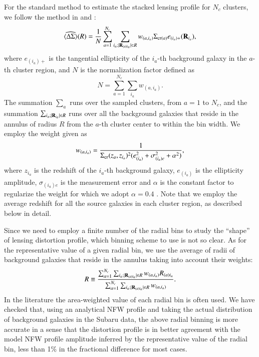 \documentclass[iop, apj]{emulateapj}
\def\ave#1{\left\langle #1 \right\rangle}
\newcommand{\?}{\stackrel{?}{=}}
\begin{document}
For the standard method to estimate the stacked lensing profile for
$N_c$ clusters,  we follow the method in
\citet{Johnstonetal:07} and \citet{Mandelbaumetal:13}:
%
  \begin{equation}
    \widehat{\ave{\Delta\Sigma}}(R)=
    \frac{1}{N}\sum_{a=1}^{N_c}\sum_{i_a; |{\bf R}_{(a)i_a}|\in R}
    w_{(a, i_a)}\Sigma_{{\rm cr}(a)}
    e_{(i_a)+}({\bf R}_{i_a}),
    \label{eq:est_dSigma}
   \end{equation}
%
where $e_{(i_a)+}$ is the tangential ellipticity of the $i_a$-th
background galaxy in the $a$-th cluster region, and $N$ is the
normalization factor defined as
%
\begin{equation}
 N=\sum_{a=1}^{N_c}\sum_{i_a} w_{(a,i_a)}.
\end{equation}
%
The summation $\sum_{a}$ runs over the sampled clusters, from $a=1$ to
$N_c $,
and the summation $\sum_{i_a; |{\bf R}_{i_a}|\in
R}$ runs over all the background galaxies that reside in the annulus of
radius $R$ from the $a$-th cluster center to within the bin width.  We
employ the weight given as
%
\begin{equation}
w_{(a,i_a)}=\frac{1}{\Sigma_{\rm
cr}(z_a,z_{i_a})^2(e_{(i_a)}^2+\sigma_{(i_a)e}^2+\alpha^2)},
\label{eq:w}
\end{equation}
%
where $z_{i_a}$ is the redshift of the $i_a$-th background galaxy,
$e_{(i_a)}$ is the ellipticity amplitude, $\sigma_{(i_a)e}$ is the
measurement error and $\alpha$ is the constant factor to regularize the
weight for which we adopt $\alpha=0.4$ \citep{Okabeetal:10}. Note that
we employ the average redshift for all the source galaxies in each
cluster region, as described below in detail.

Since we need to employ a finite number of the radial bins to study the
``shape'' of lensing distortion profile, which binning scheme to use is
not so clear.  As for the representative value of a given radial bin, we
use the average of radii of background galaxies that reside in the
annulus taking into account their weights:
%
\begin{equation}
 R \equiv \frac{\sum_{a=1}^{N_c}\sum_{i_a; |{\bf R}_{(a)i_a}|\in
  R}w_{(a, i_a)}R_{(a)i_a}}{\sum_{a=1}^{N_c}\sum_{i_a; |{\bf
  R}_{(a)i_a}|\in R}w_{(a, i_a)} }.
  \label{eq:r}
\end{equation}
%
In the literature the area-weighted value of each radial bin is often
used. We have checked that, using an analytical NFW profile and taking
the actual distribution of background galaxies in the Subaru data, the
above radial binning is more accurate in a sense that the distortion
profile is in better agreement with the model NFW profile amplitude
inferred by the representative value of the radial bin, less than 1\% in
the fractional difference for most cases.
\end{document}
